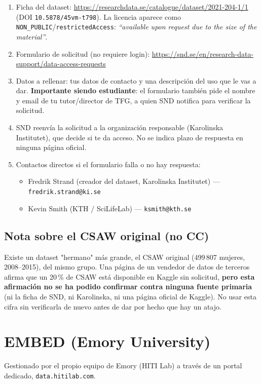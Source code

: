 \documentclass[11pt,a4paper]{article}
\begin{document}
\begin{enumerate}[leftmargin=1.2cm]
  \item Ficha del dataset:
        \url{https://researchdata.se/catalogue/dataset/2021-204-1/1}
        (DOI \texttt{10.5878/45vm-t798}). La licencia aparece como
        \texttt{NON\_PUBLIC}/\texttt{restrictedAccess}: \emph{``available
        upon request due to the size of the material''}.
  \item Formulario de solicitud (no requiere login):
        \url{https://snd.se/en/research-data-support/data-access-requests}
  \item Datos a rellenar: tus datos de contacto y una descripción del uso
        que le vas a dar. \textbf{Importante siendo estudiante}: el
        formulario también pide el nombre y email de tu tutor/director de
        TFG, a quien SND notifica para verificar la solicitud.
  \item SND reenvía la solicitud a la organización responsable
        (Karolinska Institutet), que decide si te da acceso. No se indica
        plazo de respuesta en ninguna página oficial.
  \item Contactos directos si el formulario falla o no hay respuesta:
        \begin{itemize}
          \item Fredrik Strand (creador del dataset, Karolinska Institutet)
                --- \texttt{fredrik.strand@ki.se}
          \item Kevin Smith (KTH / SciLifeLab) --- \texttt{ksmith@kth.se}
        \end{itemize}
\end{enumerate}

\subsection*{Nota sobre el CSAW original (no CC)}
Existe un dataset "hermano" más grande, el CSAW original (499\,807 mujeres,
2008--2015), del mismo grupo. Una página de un vendedor de datos de
terceros afirma que un 20\,\% de CSAW está disponible en Kaggle sin
solicitud, \textbf{pero esta afirmación no se ha podido confirmar contra
ninguna fuente primaria} (ni la ficha de SND, ni Karolinska, ni una página
oficial de Kaggle). No usar esta cifra sin verificarla de nuevo antes de
dar por hecho que hay un atajo.

\section{EMBED (Emory University)}
\label{sec:embed}
Gestionado por el propio equipo de Emory (HITI Lab) a través de un portal
dedicado, \texttt{data.hitilab.com}.
\end{document}
